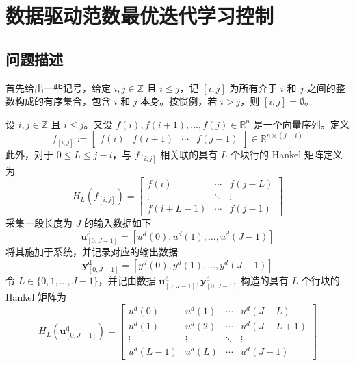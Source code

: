 \chapter{数据驱动范数最优迭代学习控制}

\section{问题描述}
首先给出一些记号，给定 \(i, j \in \mathbb{Z}\) 且 \(i \leq j\)，记 \([i, j]\) 为所有介于 \(i\) 和 \(j\) 之间的整数构成的有序集合，包含 \(i\) 和 \(j\) 本身。按惯例，若 \(i > j\)，则 \([i, j] = \emptyset\)。

设 \(i, j \in \mathbb{Z}\) 且 \(i \leq j\)。又设 \(f(i), f(i+1), \ldots, f(j) \in \mathbb{R}^n\) 是一个向量序列。定义
\begin{equation}
	f_{[i,j]} := \begin{bmatrix} f(i) & f(i+1) & \cdots & f(j-1) \end{bmatrix} \in \mathbb{R}^{n \times (j-i)}
	\label{eq:f_interval}
\end{equation}
此外，对于 \(0 \leq L \leq j-i\)，与 \(f_{[i,j]}\) 相关联的具有 \(L\) 个块行的 Hankel 矩阵定义为
\begin{equation}
	H_L(f_{[i,j]}) = 
	\begin{bmatrix}
		f(i)     & \cdots & f(j-L) \\
		\vdots   & \ddots & \vdots \\
		f(i+L-1)   & \cdots & f(j-1)
	\end{bmatrix}
	\label{eq:hankel_def}
\end{equation}
采集一段长度为 \(J\) 的输入数据如下
\begin{equation}
	\mathbf{u}^{\mathrm{d}}_{[0,J-1]} = [u^d(0), u^d(1), \dots, u^d(J-1)]
	\label{eq:input_sequence}
\end{equation}
将其施加于系统，并记录对应的输出数据
\begin{equation}
	\mathbf{y}^{\mathrm{d}}_{[0,J-1]} = [y^d(0), y^d(1), \dots, y^d(J-1)]
	\label{eq:y_sequence}
\end{equation}
令 \( L \in \{0, 1, \dots, J-1\} \)，并记由数据 \(\mathbf{u}^{\mathrm{d}}_{[0,J-1]}, \mathbf{y}^{\mathrm{d}}_{[0,J-1]}\) 构造的具有 \( L \) 个行块的 Hankel 矩阵为
\begin{equation}
	H_L(\mathbf{u}^{\mathrm{d}}_{[0,J-1]}) = \begin{bmatrix}
		u^d(0)   & u^d(1)   & \cdots & u^d(J-L) \\
		u^d(1)   & u^d(2)   & \cdots & u^d(J-L+1)   \\
		\vdots   & \vdots   & \ddots & \vdots     \\
		u^d(L-1)   & u^d(L) & \cdots & u^d(J-1)
	\end{bmatrix}
	\label{eq:hankel_u}
\end{equation}
